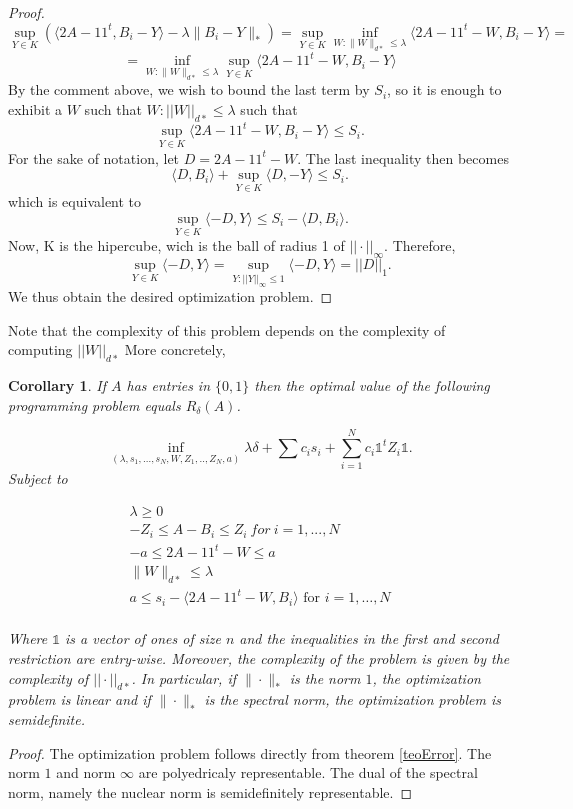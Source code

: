 \documentclass[12pt]{amsart}
\newtheorem{cor}[lemma]{Corollary}
\numberwithin{equation}{section}
\begin{document}
\begin{proof}
\[\sup_{Y\in K} \left(\langle 2A-11^t, B_i-Y\rangle -\lambda \|B_i-Y\|_*\right)=
\sup_{Y\in K} \inf_{W: \|W\|_{d*}\leq \lambda} \langle 2A-11^t-W, B_i-Y\rangle  =\]
\[=\inf_{W: \|W\|_{d*}\leq \lambda}\sup_{Y\in K}\langle 2A-11^t-W, B_i-Y\rangle 
\]
By the comment above, we wish to bound the last term by $S_i$, so it is enough to exhibit a $W$ such that $W: ||W||_{d*} \leq \lambda$ such that
\[
\sup_{Y\in K} \langle 2A-11^t-W, B_i-Y\rangle \leq S_i.
\]
For the sake of notation, let 
$D= 2A-11^t-W$.
The last inequality then becomes
\[
\langle D,B_i\rangle + \sup_{Y \in K}\langle D,-Y \rangle \leq S_i.
\]
which is equivalent to 
\[
 \sup_{Y \in K}\langle -D,Y \rangle \leq S_i-\langle D,B_i\rangle.
\]
Now, K is the hipercube, wich is the ball of radius 1 of $||\cdot||_\infty$. 
Therefore, 
\[
 \sup_{Y \in K}\langle -D,Y \rangle = \sup_{Y:||Y||_\infty \leq 1}\langle -D,Y \rangle = ||D||_1.
\]
We thus obtain the desired optimization problem.
\end{proof}
Note that the complexity of this problem depends on the complexity of computing $||W||_{d*}$
 More concretely,

\begin{cor} If $A$ has entries in $\{0,1\}$ then the optimal value of the following  programming problem equals $R_{\delta}(A)$.

\[
 \inf_{(\lambda,s_1,\dots, s_N,W,Z_1,..,Z_N,a)} \lambda\delta +\sum c_is_i + \sum_{i=1}^N c_i \mathds{1}^t Z_i \mathds{1}.
\]
Subject to
\begin{center}
\[
\begin{array}{l}
\lambda \geq 0\\
-Z_i \leq A-B_i  \leq Z_i \ for \ i=1,...,N\\
-a \leq 2A-11^t-W \leq a \\
\|W\|_{d*}\leq \lambda\\
a\leq s_i-\langle 2A-11^t-W, B_i\rangle\text{ for $i=1,\dots, N$}\\
\end{array}
\]
\end{center}


Where $\mathds{1}$ is a vector of ones of size $n$ and the inequalities in the first and second restriction are entry-wise. Moreover, the complexity of the problem is given by the complexity of $||\cdot||_{d*}$. In particular, if $\|\cdot\|_*$ is the norm $1$, the optimization problem is linear and if  $\|\cdot\|_*$ is the spectral norm, the optimization problem is semidefinite.  
\end{cor}
\begin{proof}
The optimization problem follows directly from theorem \ref{teoError}. The norm $1$ and norm $\infty$ are polyedricaly representable. The dual of the spectral norm, namely the nuclear norm is semidefinitely representable.
\end{proof}
\end{document}
